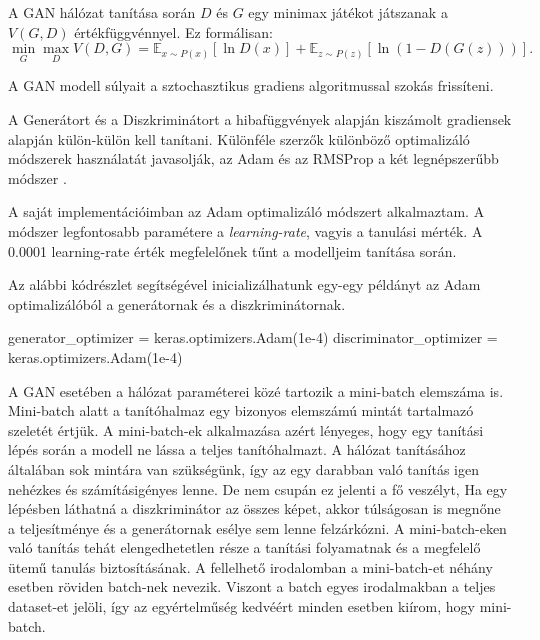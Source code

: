 A GAN hálózat tanítása során $D$ és $G$ egy minimax játékot játszanak a $V(G, D)$ értékfüggvénnyel. Ez formálisan:
$$\min_{G}\max_{D}V(D, G) =  \mathbb{E}_{x \sim P(x)} \left[\ln D(x) \right] + \mathbb{E}_{z \sim P(z)} \left[\ln(1 - D(G(z))) \right].$$

A GAN modell súlyait a sztochasztikus gradiens algoritmussal szokás frissíteni.

A Generátort és a Diszkriminátort a hibafüggvények alapján kiszámolt gradiensek alapján külön-külön kell tanítani. Különféle szerzők különböző optimalizáló módszerek használatát javasolják, az Adam és az RMSProp a két legnépszerűbb módszer \cite{kingma2014adam}.

A saját implementációimban az Adam optimalizáló módszert alkalmaztam. A módszer legfontosabb paramétere a \textit{learning-rate}, vagyis a tanulási mérték. A 0.0001 learning-rate érték megfelelőnek tűnt a modelljeim tanítása során.


Az alábbi kódrészlet segítségével inicializálhatunk egy-egy példányt az Adam optimalizálóból a generátornak és a diszkriminátornak.

\begin{python}
generator_optimizer = keras.optimizers.Adam(1e-4)
discriminator_optimizer = keras.optimizers.Adam(1e-4)
\end{python}


A GAN esetében a hálózat paraméterei közé tartozik a mini-batch elemszáma is. Mini-batch alatt a tanítóhalmaz egy bizonyos elemszámú mintát tartalmazó szeletét értjük. A mini-batch-ek alkalmazása azért lényeges, hogy egy tanítási lépés során a modell ne lássa a teljes tanítóhalmazt. A hálózat tanításához általában sok mintára van szükségünk, így az egy darabban való tanítás igen nehézkes és számításigényes lenne. De nem csupán ez jelenti a fő veszélyt, Ha egy lépésben láthatná a diszkriminátor az összes képet, akkor túlságosan is megnőne a teljesítménye és a generátornak esélye sem lenne felzárkózni. A mini-batch-eken való tanítás tehát elengedhetetlen része a tanítási folyamatnak és a megfelelő ütemű tanulás biztosításának.
A fellelhető irodalomban a mini-batch-et néhány esetben röviden batch-nek nevezik. Viszont a batch egyes irodalmakban a teljes dataset-et jelöli, így az egyértelműség kedvéért minden esetben kiírom, hogy mini-batch.

